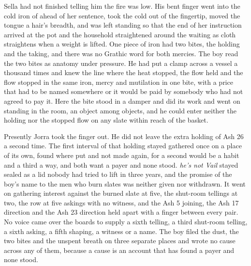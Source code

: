 Sella had not finished telling him the fire was low. His bent finger went into the cold iron of  ahead of her sentence, took the cold out of the fingertip, moved the tongue a hair's breadth, and was left standing so that the end of her instruction arrived at the pot and the household straightened around the waiting as cloth straightens when a weight is lifted. One piece of iron had two bites, the holding and the taking, and there was no Grathic word for both mercies. The boy read the two bites as anatomy under pressure. He had put a clamp across a vessel a thousand times and knew the line where the heat stopped, the flow held and the flow stopped in the same iron, mercy and mutilation in one bite, with a price that had to be named somewhere or it would be paid by somebody who had not agreed to pay it. Here the bite stood in a damper and did its work and went on standing in the room, an object among objects, and he could enter neither the holding nor the stopped flow on any slate within reach of the basket.

Presently Jorra took the finger out. He did not leave the extra holding of Ash 26 a second time. The first interval of that holding stayed gathered once on a place of its own, found where put and not made again, for a second would be a habit and a third a way, and both want a payer and none stood. \emph{he's not Vail} stayed sealed as a lid nobody had tried to lift in three years, and the promise of the boy's name to the men who burn slates was neither given nor withdrawn. It went on gathering interest against the burned slate at five, the shut-room tellings at two, the row at five askings with no witness, and the Ash 5 joining, the Ash 17 direction and the Ash 23 direction held apart with a finger between every pair. No voice came over the boards to supply a sixth telling, a third shut-room telling, a sixth asking, a fifth shaping, a witness or a name. The boy filed the dust, the two bites and the unspent breath on three separate places and wrote no cause across any of them, because a cause is an account that has found a payer and none stood.

\scenebreak

